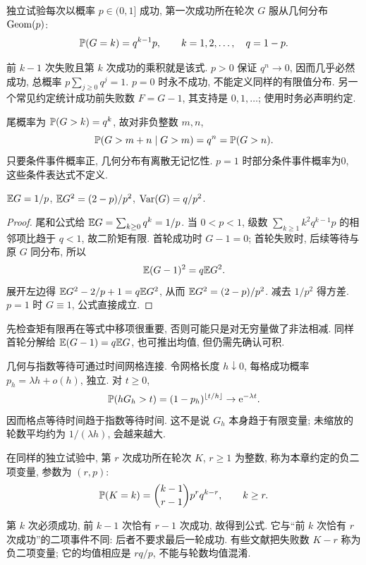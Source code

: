 \begin{definition}
独立试验每次以概率 $p\in(0,1]$ 成功, 第一次成功所在轮次 $G$ 服从几何分布 $\operatorname{Geom}(p)$:
\[
\mathbb P(G=k)=q^{k-1}p,\qquad k=1,2,\ldots,\quad q=1-p.
\]
\end{definition}
前 $k-1$ 次失败且第 $k$ 次成功的乘积就是该式. $p>0$ 保证 $q^n\to0$, 因而几乎必然成功, 总概率 $p\sum_{j\ge0}q^j=1$. $p=0$ 时永不成功, 不能定义同样的有限值分布. 另一个常见约定统计成功前失败数 $F=G-1$, 其支持是 $0,1,\ldots$; 使用时务必声明约定.

尾概率为 $\mathbb P(G>k)=q^k$, 故对非负整数 $m,n$,
\[
\mathbb P(G>m+n\mid G>m)=q^n=\mathbb P(G>n).
\]
只要条件事件概率正, 几何分布有离散无记忆性. $p=1$ 时部分条件事件概率为0, 这些条件表达式不定义.
\begin{proposition}
$\mathbb E G=1/p$, $\mathbb E G^2=(2-p)/p^2$, $\operatorname{Var}(G)=q/p^2$.
\end{proposition}
\begin{proof}
尾和公式给 $\mathbb E G=\sum_{k\ge0}q^k=1/p$. 当 $0<p<1$, 级数 $\sum_{k\ge1}k^2q^{k-1}p$ 的相邻项比趋于 $q<1$, 故二阶矩有限. 首轮成功时 $G-1=0$; 首轮失败时, 后续等待与原 $G$ 同分布, 所以
\[
\mathbb E(G-1)^2=q\mathbb E G^2.
\]
展开左边得 $\mathbb E G^2-2/p+1=q\mathbb E G^2$, 从而 $\mathbb E G^2=(2-p)/p^2$. 减去 $1/p^2$ 得方差. $p=1$ 时 $G\equiv1$, 公式直接成立.
\end{proof}
先检查矩有限再在等式中移项很重要, 否则可能只是对无穷量做了非法相减. 同样首轮分解给 $\mathbb E(G-1)=q\mathbb E G$, 也可推出均值, 但仍需先确认可积.

几何与指数等待可通过时间网格连接. 令网格长度 $h\downarrow0$, 每格成功概率 $p_h=\lambda h+o(h)$, 独立. 对 $t\ge0$,
\[
\mathbb P(hG_h>t)=(1-p_h)^{\lfloor t/h\rfloor}\to\mathrm e^{-\lambda t}.
\]
因而格点等待时间趋于指数等待时间. 这不是说 $G_h$ 本身趋于有限变量; 未缩放的轮数平均约为 $1/(\lambda h)$, 会越来越大.

\begin{definition}
在同样的独立试验中, 第 $r$ 次成功所在轮次 $K$, $r\ge1$ 为整数, 称为本章约定的负二项变量, 参数为 $(r,p)$:
\[
\mathbb P(K=k)=\binom{k-1}{r-1}p^rq^{k-r},\qquad k\ge r.
\]
\end{definition}
第 $k$ 次必须成功, 前 $k-1$ 次恰有 $r-1$ 次成功, 故得到公式. 它与“前 $k$ 次恰有 $r$ 次成功”的二项事件不同: 后者不要求最后一轮成功. 有些文献把失败数 $K-r$ 称为负二项变量; 它的均值相应是 $rq/p$, 不能与轮数均值混淆.

